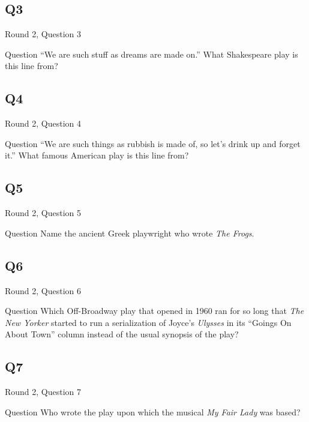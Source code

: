 \documentclass[11pt]{beamer}
\begin{document}
\subsection*{Q3}
\begin{frame}[t]{Round 2, Question 3}
\vspace{0.5em}
\begin{block}{Question}
``We are such stuff as dreams are made on.'' What Shakespeare play is this line from?
\end{block}
\end{frame}
    

\subsection*{Q4}
\begin{frame}[t]{Round 2, Question 4}
\vspace{0.5em}
\begin{block}{Question}
``We are such things as rubbish is made of, so let's drink up and forget it.'' What famous American play is this line from?
\end{block}
\end{frame}
    

\subsection*{Q5}
\begin{frame}[t]{Round 2, Question 5}
\vspace{0.5em}
\begin{block}{Question}
Name the ancient Greek playwright who wrote \emph{The Frogs}.
\end{block}
\end{frame}
    

\subsection*{Q6}
\begin{frame}[t]{Round 2, Question 6}
\vspace{0.5em}
\begin{block}{Question}
Which Off-Broadway play that opened in 1960 ran for so long that \emph{The New Yorker} started to run a serialization of Joyce's \emph{Ulysses} in its ``Goings On About Town'' column instead of the usual synopsis of the play?
\end{block}
\end{frame}
    

\subsection*{Q7}
\begin{frame}[t]{Round 2, Question 7}
\vspace{0.5em}
\begin{block}{Question}
Who wrote the play upon which the musical \emph{My Fair Lady} was based?
\end{block}
\end{frame}
    
\end{document}
